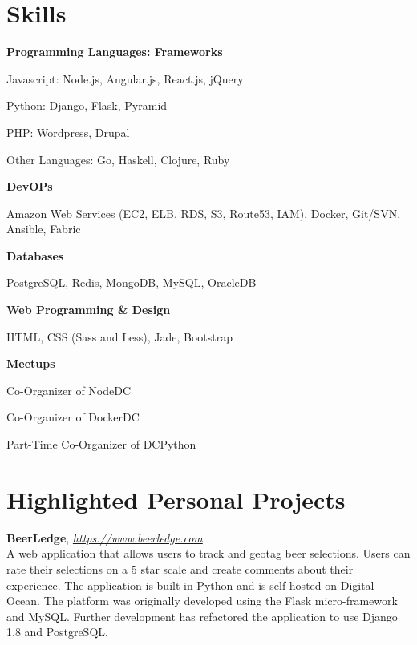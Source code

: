 \documentclass[margin,line,10pt]{resume}
\begin{document}
\begin{resume}
\section{\mysidestyle Skills\\\vspace{5pt}}
\vspace{0mm}
\begin{multicols}{2}
    \textbf{Programming Languages: Frameworks}
    \begin{list2}
        \item Javascript: Node.js, Angular.js, React.js, jQuery
        \item Python: Django, Flask, Pyramid
        \item PHP: Wordpress, Drupal
        \item Other Languages: Go, Haskell, Clojure, Ruby
    \end{list2}
    \textbf{DevOPs}
    \begin{list2}
        \item Amazon Web Services (EC2, ELB, RDS, S3, Route53, IAM), Docker, Git/SVN, Ansible, Fabric
    \end{list2}
    \columnbreak
    \textbf{Databases}
    \begin{list2}
        \item PostgreSQL, Redis, MongoDB, MySQL, OracleDB
    \end{list2}
    \textbf{Web Programming \& Design}
    \begin{list2}
        \item HTML, CSS (Sass and Less), Jade, Bootstrap
    \end{list2}
    \textbf{Meetups}
    \begin{list2}
        \item Co-Organizer of NodeDC
        \item Co-Organizer of DockerDC
        \item Part-Time Co-Organizer of DCPython
    \end{list2}
\end{multicols}

\section{\mysidestyle Highlighted Personal Projects\\\vspace{5pt}}
\textbf{BeerLedge}, \textsl{\href{https://www.beerledge.com}{https://www.beerledge.com}}\\
A web application that allows users to track and geotag beer selections.  Users can rate their selections on a 5 star
scale and create comments about their experience. The  application  is  built in Python and is self-hosted on Digital
Ocean.  The platform was originally developed using  the Flask micro-framework  and  MySQL.  Further development has
refactored the application to use Django 1.8 and PostgreSQL.


\end{resume}
\end{document}

